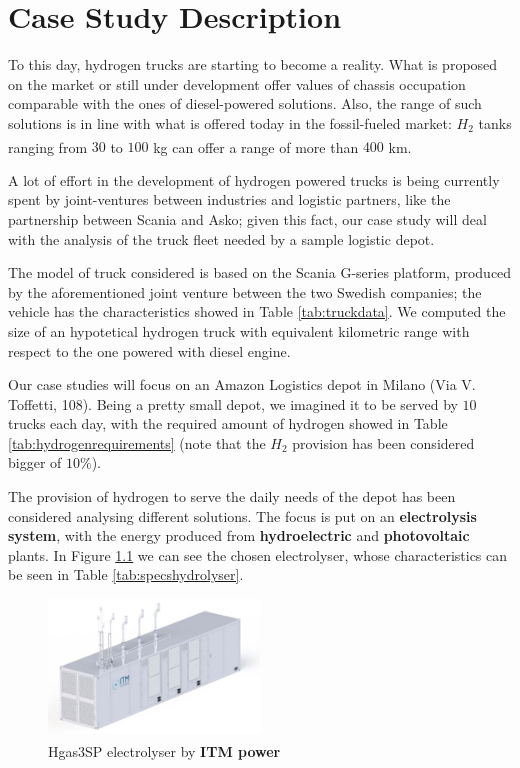 \newpage
\chapter{Case Study Description}
To this day, hydrogen trucks are starting to become a reality. 
What is proposed on the market or still under development offer values of chassis occupation comparable with the ones of diesel-powered solutions.
Also, the range of such solutions is in line with what is offered today in the fossil-fueled market: $H_2$ tanks ranging from $30$ to $100$ kg can offer a range of more than $400$ km\textsuperscript{\cite{pianoidrogeno}}.

A lot of effort in the development of hydrogen powered trucks is being currently spent by joint-ventures between industries and logistic partners, like the partnership between Scania and Asko; given this fact, our case study will deal with the analysis of the truck fleet needed by a sample logistic depot.

The model of truck considered is based on the Scania G-series platform, produced by the aforementioned joint venture between the two Swedish companies; the vehicle has the characteristics showed in Table \ref{tab:truckdata}. We computed the size of an hypotetical hydrogen truck with equivalent kilometric range with respect to the one powered with diesel engine.


Our case studies will focus on an Amazon Logistics depot in Milano (Via V. Toffetti, 108). Being a pretty small depot, we imagined it to be served by $10$ trucks each day, with the required amount of hydrogen showed in Table \ref{tab:hydrogenrequirements} (note that the $H_2$ provision has been considered bigger of $10\%$).



The provision of hydrogen to serve the daily needs of the depot has been considered analysing different solutions. The focus is put on an \textbf{electrolysis system}, with the energy produced from \textbf{hydroelectric} and \textbf{photovoltaic} plants. In Figure \ref{fig:electrolyser} we can see the chosen electrolyser, whose characteristics can be seen in Table \ref{tab:specshydrolyser}.

\begin{figure}[H]
\centering
    \includegraphics[width=0.5\textwidth]{Chapters/Pictures/HGas 3SP.JPG}
    \caption{Hgas3SP electrolyser by \textbf{ITM power}\textsuperscript{\cite{HGas3SP}}}
    \label{fig:electrolyser}
\end{figure}

